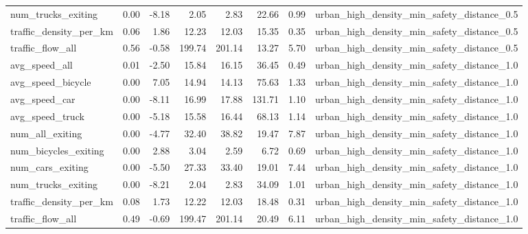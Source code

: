 \begin{table}[ht]
\begin{tabular}{lrrrrrrl}
  num\_trucks\_exiting & 0.00 & -8.18 & 2.05 & 2.83 & 22.66 & 0.99 & urban\_high\_density\_min\_safety\_distance\_0.5 \\ 
  traffic\_density\_per\_km & 0.06 & 1.86 & 12.23 & 12.03 & 15.35 & 0.35 & urban\_high\_density\_min\_safety\_distance\_0.5 \\ 
  traffic\_flow\_all & 0.56 & -0.58 & 199.74 & 201.14 & 13.27 & 5.70 & urban\_high\_density\_min\_safety\_distance\_0.5 \\ 
  avg\_speed\_all & 0.01 & -2.50 & 15.84 & 16.15 & 36.45 & 0.49 & urban\_high\_density\_min\_safety\_distance\_1.0 \\ 
  avg\_speed\_bicycle & 0.00 & 7.05 & 14.94 & 14.13 & 75.63 & 1.33 & urban\_high\_density\_min\_safety\_distance\_1.0 \\ 
  avg\_speed\_car & 0.00 & -8.11 & 16.99 & 17.88 & 131.71 & 1.10 & urban\_high\_density\_min\_safety\_distance\_1.0 \\ 
  avg\_speed\_truck & 0.00 & -5.18 & 15.58 & 16.44 & 68.13 & 1.14 & urban\_high\_density\_min\_safety\_distance\_1.0 \\ 
  num\_all\_exiting & 0.00 & -4.77 & 32.40 & 38.82 & 19.47 & 7.87 & urban\_high\_density\_min\_safety\_distance\_1.0 \\ 
  num\_bicycles\_exiting & 0.00 & 2.88 & 3.04 & 2.59 & 6.72 & 0.69 & urban\_high\_density\_min\_safety\_distance\_1.0 \\ 
  num\_cars\_exiting & 0.00 & -5.50 & 27.33 & 33.40 & 19.01 & 7.44 & urban\_high\_density\_min\_safety\_distance\_1.0 \\ 
  num\_trucks\_exiting & 0.00 & -8.21 & 2.04 & 2.83 & 34.09 & 1.01 & urban\_high\_density\_min\_safety\_distance\_1.0 \\ 
  traffic\_density\_per\_km & 0.08 & 1.73 & 12.22 & 12.03 & 18.48 & 0.31 & urban\_high\_density\_min\_safety\_distance\_1.0 \\ 
  traffic\_flow\_all & 0.49 & -0.69 & 199.47 & 201.14 & 20.49 & 6.11 & urban\_high\_density\_min\_safety\_distance\_1.0 \\ 
   \hline
\end{tabular}
\end{table}
